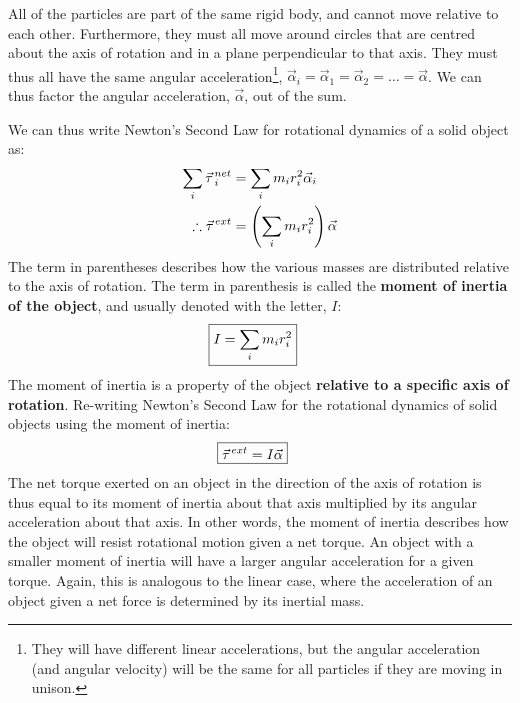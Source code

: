 All of the particles are part of the same rigid body, and cannot move relative to each other. Furthermore, they must all move around circles that are centred about the axis of rotation and in a plane perpendicular to that axis. They must thus all have the same angular acceleration\footnote{They will have different linear accelerations, but the angular acceleration (and angular velocity) will be the same for all particles if they are moving in unison.}, $\vec\alpha_i = \vec \alpha_1 = \vec \alpha_2 =\dots=\vec\alpha$. We can thus factor the angular acceleration, $\vec \alpha$, out of the sum.

We can thus write Newton's Second Law for rotational dynamics of a solid object as:
\begin{align*}
\sum_i \pvec\tau_i^{net} &= \sum_i  m_ir_i^2\vec\alpha_i\\
\therefore \pvec\tau^{ext}&= \left(\sum_i  m_ir_i^2\right)\vec\alpha
\end{align*}
The term in parentheses describes how the various masses are distributed relative to the axis of rotation. The term in parenthesis is called the \textbf{moment of inertia of the object}, and usually denoted with the letter, $I$:
\begin{align}
\Aboxed{I = \sum_i  m_ir_i^2}
\end{align}
The moment of inertia is a property of the object \textbf{relative to a specific axis of rotation}. Re-writing Newton's Second Law for the rotational dynamics of solid objects using the moment of inertia:
\begin{align}
\Aboxed{\pvec\tau^{ext}&= I\vec\alpha}
\end{align}
The net torque exerted on an object in the direction of the axis of rotation is thus equal to its moment of inertia about that axis multiplied by its angular acceleration about that axis. In other words, the moment of inertia describes how the object will resist rotational motion given a net torque. An object with a smaller moment of inertia will have a larger angular acceleration for a given torque. Again, this is analogous to the linear case, where the acceleration of an object given a net force is determined by its inertial mass.
\vspace{-0.25cm}
